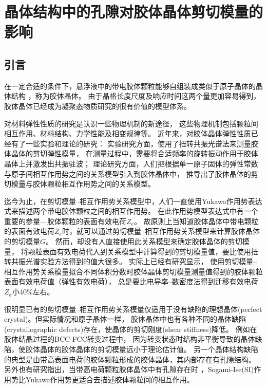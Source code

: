 \chapter{晶体结构中的孔隙对胶体晶体剪切模量的影响}
\section{引言}

在一定合适的条件下，悬浮液中的带电胶体颗粒能够自组装成类似于原子晶体的晶体结构 \cite{Luo2010,Russel2003, Anderson2002}，称为胶体晶体。
由于晶格长度尺度及响应时间这两个量更加容易得到，胶体晶体已经成为凝聚态物质研究的很有价值的模型体系\cite{Yethiraj2007,Yunker2014}。

对材料弹性性质的研究是认识一些物理机制的新途径\cite{Wette2004,Anderson2013,Meng2014,Kung2004}，
这些物理机制包括颗粒间相互作用、材料结构、力学性能及相变规律等。
近年来，对胶体晶体弹性性质已经有了一些实验和理论的研究\cite{Crandall1977,Wette2002,Zhou2013,Ouyang2014,Tang2008}：
实验研究方面，使用了扭转共振光谱法来测量胶体晶体的剪切弹性模量\cite{Wette2003,Zhou2015,Schope2001}，
在测量过程中，需要将合适频率的旋转振动作用于胶体晶体上并激发出共振驻波；
理论研究方面，人们把根据单一原子固体的弹性常数与原子间相互作用势之间的关系模型\cite{Fuchs1936a,Fuchs1936,Johnson1972}引入到胶体晶体中，
推导出了胶体晶体的剪切模量与胶体颗粒相互作用势之间的关系模型\cite{Dubois-Violette1980,Joanny1979}。

迄今为止，在剪切模量--相互作用势关系模型中，人们一直使用Yukawa作用势表达式来描述两个带电胶体颗粒之间的相互作用势\cite{Wette2004}。
在此作用势模型表达式中有一个重要的参量---胶体颗粒的表面有效电荷$Z_e$。
故原则上当知道胶体晶体中带电颗粒的表面有效电荷$Z_e$时，就可以通过剪切模量--相互作用势关系模型来计算胶体晶体的剪切模量$G$。
然而，却没有人直接使用此关系模型来确定胶体晶体的剪切模量，
将颗粒表面有效电荷代入到关系模型中计算得到的剪切模量值，要比使用扭转共振光谱实验方法得到的值大很多。
实际上已经有研究\cite{Wette2002}显示，
使用剪切模量--相互作用势关系模量拟合不同体积分数时胶体晶体剪切模量测量值得到的胶体颗粒表面有效电荷值（弹性有效电荷），
总是要比电导率--数密度法得到迁移有效电荷$Z_σ$小40\%左右。

很明显已有的剪切模量--相互作用势关系模量仅适用于没有缺陷的理想晶体(perfect crystal)。但实际情况和原子晶体一样，
胶体晶体中也有各种不同的晶体缺陷(crystallographic defects)存在\cite{Yoshida1991}，使晶体的剪切刚度(shear stiffness)降低。
例如\cite{Zhou2011}在胶体结晶过程的BCC-FCC转变过程中，
因为转变状态时结构非平衡导致的晶体缺陷，使胶体晶体的胶体晶体的剪切模量远小于理论估计值。
另一个晶体结构缺陷的典型\cite{Zhou2013,Ouyang2014,Yoshida1991}是由带高表面电荷的胶体颗粒形成的胶体晶体，其内部存在有孔隙结构。
另外也有研究\cite{Ouyang2014,Tata2015}指出，当带高电荷颗粒胶体晶体中有孔隙存在时
，Sogami-Ise(SI)作用势比Yukawa作用势更适合去描述胶体颗粒间的相互作用。

